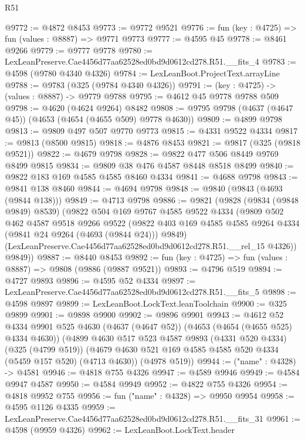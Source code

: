 \begin{lexlean}{R51}
\begin{coremodule}
@9772 := @4872 @8453
@9773 := @9772 @9521
@9776 := fun (key : @4725) => fun (values : @8887) => @9771 @9773
@9777 := @4595 @45
@9778 := @8461 @9266
@9779 := @9777 @9778
@9780 := LexLeanPreserve.Cae4456d77aa62528ed0bd9d0612cd278.R51.__fits_4
@9783 := @4598 (@9780 @4340 @4326)
@9784 := LexLeanBoot.ProjectText.arrayLine
@9788 := @9783 (@325 (@9784 @4340 @4326))
@9791 := (key : @4725) -> (values : @8887) -> @9779 @9788
@9795 := @4612 @45 @9778 @9788 @509
@9798 := @4620 (@4624 @9264) @8482
@9808 := @9795 @9798 (@4637 (@4647 @45)) (@4653 (@4654 (@4655 @509) @9778 @4630))
@9809 := @4899 @9798
@9813 := @9809 @497 @507 @9770 @9773
@9815 := @4331 @9522 @4334
@9817 := @9813 (@8500 @9815)
@9818 := @4876 @8453
@9821 := @9817 (@325 (@9818 @9521))
@9822 := @4679 @9798
@9828 := @9822 @477 @506 @8449 @9769 @8499 @9815
@9834 := @9809 @38 @476 @4587 @8448 @8518 @8499
@9840 := @9822 @183 @169 @4585 @4585 @8460 @4334
@9841 := @4688 @9798
@9843 := @9841 @138 @8460
@9844 := @4694 @9798
@9848 := @9840 (@9843 (@4693 (@9844 @138)))
@9849 := @4713 @9798
@9886 := @9821
    (@9828
      (@9834 (@9848 @9849) @8539)
      (@9822
        @504
        @169
        @9767
        @4585
        @9522
        @4334
        (@9809
          @502
          @462
          @4587
          @9518
          @9266
          @9522
          (@9822 @403 @169 @4585 @4585 @9264 @4334 (@9841 @24 @9264 (@4693 (@9844 @24))) @9849)
          (LexLeanPreserve.Cae4456d77aa62528ed0bd9d0612cd278.R51.__rel_15 @4326))
        @9849))
@9887 := @8440 @8453
@9892 := fun (key : @4725) => fun (values : @8887) => @9808 (@9886 (@9887 @9521))
@9893 := @4796 @519
@9894 := @4727 @9893
@9896 := @4595 @52 @4334
@9897 := LexLeanPreserve.Cae4456d77aa62528ed0bd9d0612cd278.R51.__fits_5
@9898 := @4598 @9897
@9899 := LexLeanBoot.LockText.leanToolchain
@9900 := @325 @9899
@9901 := @9898 @9900
@9902 := @9896 @9901
@9943 := @4612
    @52
    @4334
    @9901
    @525
    @4630
    (@4637 (@4647 @52))
    (@4653 (@4654 (@4655 @525) @4334 @4630))
    (@4899
      @4630
      @517
      @523
      @4587
      @9893
      (@4331 @520 @4334)
      (@325 (@4799 @519))
      (@4679 @4630 @521 @169 @4585 @4585 @520 @4334 (@5459 @157 @520) (@4713 @4630))
      (@4978 @519))
@9944 := ("name" : @4328) -> @4581
@9946 := @4818 @755 @4326
@9947 := @4589 @9946
@9949 := @4584 @9947 @4587
@9950 := @4584 @9949
@9952 := @4822 @755 @4326
@9954 := @4818 @9952 @755
@9956 := fun ("name" : @4328) => @9950 @9954
@9958 := @4595 @1126 @4335
@9959 := LexLeanPreserve.Cae4456d77aa62528ed0bd9d0612cd278.R51.__fits_31
@9961 := @4598 (@9959 @4326)
@9962 := LexLeanBoot.LockText.header

\end{coremodule}
\end{lexlean}

